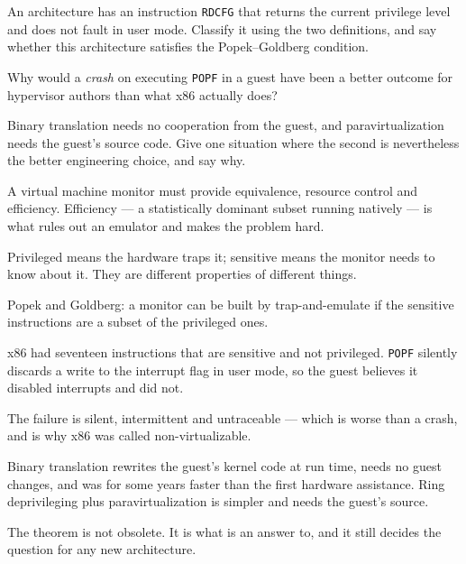 \begin{checkpoint}
\begin{tightnum}
  \item An architecture has an instruction \texttt{RDCFG} that returns the
        current privilege level and does not fault in user mode. Classify it
        using the two definitions, and say whether this architecture satisfies
        the Popek--Goldberg condition.
  \item Why would a \emph{crash} on executing \texttt{POPF} in a guest have
        been a better outcome for hypervisor authors than what x86 actually
        does?
  \item Binary translation needs no cooperation from the guest, and
        paravirtualization needs the guest's source code. Give one situation
        where the second is nevertheless the better engineering choice, and say
        why.
\end{tightnum}
\end{checkpoint}

\begin{chaptersummary}
\begin{tight}
  \item A virtual machine monitor must provide equivalence, resource control
        and efficiency. Efficiency --- a statistically dominant subset running
        natively --- is what rules out an emulator and makes the problem hard.
  \item Privileged means the hardware traps it; sensitive means the monitor
        needs to know about it. They are different properties of different
        things.
  \item Popek and Goldberg: a monitor can be built by trap-and-emulate if the
        sensitive instructions are a subset of the privileged ones.
  \item x86 had seventeen instructions that are sensitive and not privileged.
        \texttt{POPF} silently discards a write to the interrupt flag in user
        mode, so the guest believes it disabled interrupts and did not.
  \item The failure is silent, intermittent and untraceable --- which is worse
        than a crash, and is why x86 was called non-virtualizable.
  \item Binary translation rewrites the guest's kernel code at run time, needs
        no guest changes, and was for some years faster than the first
        hardware assistance. Ring deprivileging plus paravirtualization is
        simpler and needs the guest's source.
  \item The theorem is not obsolete. It is what  is an answer
        to, and it still decides the question for any new architecture.
\end{tight}
\end{chaptersummary}

